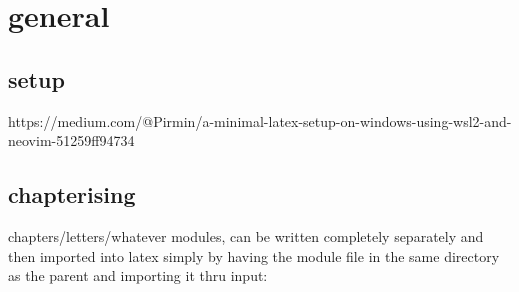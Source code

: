 \section{general}%
\label{sec:general}

\subsection{setup}%
\label{sec:setup}
https://medium.com/@Pirmin/a-minimal-latex-setup-on-windows-using-wsl2-and-neovim-51259ff94734


\subsection{chapterising}%
\label{sub:chapterising}

chapters/letters/whatever modules, can be written completely separately and then imported into latex simply by having the module file in the same directory as the parent and importing it thru input:
\begin{verbatim}
	
\end{verbatim}
